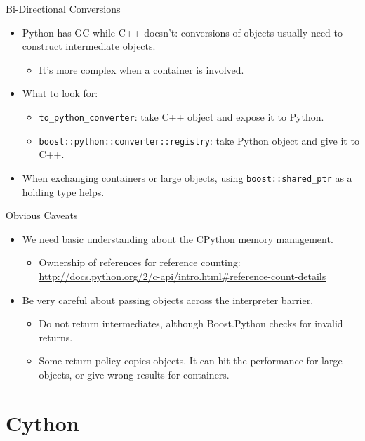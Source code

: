\documentclass[dvips,xcolor=pst,14pt]{beamer}
\begin{document}
\begin{frame}[fragile]{
%
Bi-Directional Conversions
%
}
\begin{itemize}
\item Python has GC while C++ doesn't: conversions of objects usually need to
construct intermediate objects.
\begin{itemize}
  \item It's more complex when a container is involved.
\end{itemize}
\item What to look for:
\begin{itemize}
  \item \verb+to_python_converter+: take C++ object and expose it to Python.
  \item \verb+boost::python::converter::registry+: take Python object and give
  it to C++.
\end{itemize}
\item When exchanging containers or large objects, using
\verb+boost::shared_ptr+ as a holding type helps.
\end{itemize}
\end{frame}

\begin{frame}[fragile]{
%
Obvious Caveats
%
}
\begin{itemize}
\item We need basic understanding about the CPython memory management.
\begin{itemize}
  \item Ownership of references for reference counting: {\scriptsize
  \url{http://docs.python.org/2/c-api/intro.html#reference-count-details}}
\end{itemize}
\item Be very careful about passing objects across the interpreter barrier.
\begin{itemize}
  \item Do not return intermediates, although Boost.Python checks for invalid
  returns.
  \item Some return policy copies objects.  It can hit the performance for
  large objects, or give wrong results for containers.
\end{itemize}
\end{itemize}
\end{frame}

\section{
Cython
}
\end{document}
